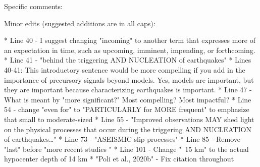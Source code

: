 \documentclass[10pt]{extarticle}
\begin{document}
\begin{ReviewerComment}{1}
\noindent 

\end{ReviewerComment}


\begin{Answer}
 \WorkInProgressRevTask
\end{Answer}
%
%







Specific comments:





Minor edits (suggested additions are in all caps):


*        Line 40 - I suggest changing "incoming" to another term that expresses more of an expectation in time, such as upcoming, imminent, impending, or forthcoming.  
*        Line 41 - "behind the triggering AND NUCLEATION of earthquakes"
*        Lines 40-41: This introductory sentence would be more compelling if you add in the importance of precursory signals beyond models. Yes, models are important, but they are important because characterizing earthquakes is important.
*        Line 47 - What is meant by "more significant?" Most compelling? Most impactful?
*        Line 54 -  change "even for" to "PARTICULARLY for MORE frequent" to emphasize that small to moderate-sized %
*        Line 55 - "Improved observations MAY shed light on the physical processes that occur during the triggering AND NUCLEATION of earthquakes…"
*        Line 73 - "ASEISMIC slip processes"
*        Line 85 - Remove "last" before "more recent studies "
*        Line 101 - Change "~15 km" to the actual hypocenter depth of 14 km
*        "Poli et al., 2020b" - Fix citation throughout





\end{document}
